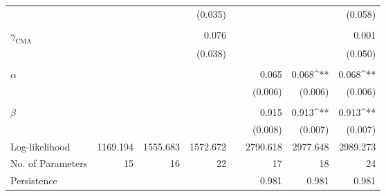 \begin{table}[!ht]
\begin{tabularx}{\textwidth}{@{}l ddd X ddd @{}}
    & & & (0.035) && & & (0.058) \\
    \\
    $\gamma_\text{CMA}$ & & & 0.076 && & & 0.001 \\
    & & & (0.038) && & & (0.050) \\
    \\
    $\alpha$ & & & && 0.065 & 0.068^{**} & 0.068^{**} \\
    & & & && (0.006) & (0.006) & (0.006) \\
    \\
    $\beta$ & & & && 0.915 & 0.913^{**} & 0.913^{**} \\
    & & & && (0.008) & (0.007) & (0.007) \\
    \midrule
    Log-likelihood & 1169.194 & 1555.683 & 1572.672 && 2790.618 & 2977.648 & 2989.273 \\
    No. of Parameters & 15 & 16 & 22 && 17 & 18 & 24 \\
    Persistence & & & && 0.981 & 0.981 & 0.981 \\
    \bottomrule
  \end{tabularx}

  \label{tab:copula_estimation}
\end{table}
